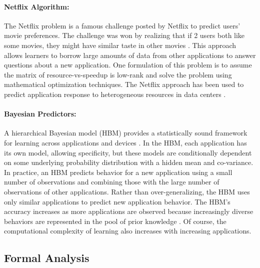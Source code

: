 \paragraph{Netflix Algorithm:}
The Netflix problem is a famous challenge posted by Netflix to predict
users' movie preferences. The challenge was won by realizing that if 2
users both like some movies, they might have similar taste in other
movies \cite{netflix}. This approach allows learners to borrow large
amounts of data from other applications to answer questions about a
new application.  One formulation of this problem is to assume the
matrix of resource-vs-speedup is low-rank and solve the problem
using mathematical optimization techniques.  The Netflix approach has
been used to predict application response to heterogeneous resources
in data centers \cite{Paragon,quasar}.

\paragraph{ Bayesian Predictors:} A hierarchical Bayesian model (HBM)
provides a statistically sound framework for learning across
applications and devices
\cite{gelman2013bayesian,morris1983parametric}.  In the HBM, each
application has its own model, allowing specificity, but these models
are conditionally dependent on some underlying probability
distribution with a hidden mean and co-variance.  In practice, an HBM
predicts behavior for a new application using a small number of
observations and combining those with the large number of observations
of other applications.  Rather than over-generalizing, the HBM uses
only similar applications to predict new application behavior.  The
HBM's accuracy increases as more applications are observed because
increasingly diverse behaviors are represented in the pool of prior
knowledge \cite{LEO}.  Of course, the computational complexity of
learning also increases with increasing applications.


\subsection{Formal Analysis}
\label{sec:guarantees}
